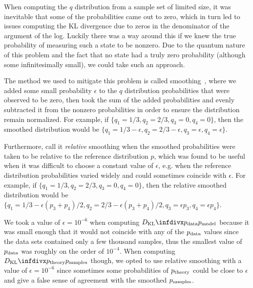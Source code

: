 When computing the \( q \) distribution from a sample set of limited size, it was inevitable that some of the probabilities came out to zero, which in turn led to issues computing the KL divergence due to zeros in the denominator of the argument of the log.
Luckily there was a way around this if we knew the true probability of measuring such a state to be nonzero.
Due to the quantum nature of this problem and the fact that no state had a truly zero probability (although some infinitesimally small), we could take such an approach.

The method we used to mitigate this problem is called smoothing~\cite{han_kl_divergence}, where we added some small probability \( \epsilon \) to the \( q \) distribution probabilities that were observed to be zero, then took the sum of the added probabilities and evenly subtracted it from the nonzero probabilities in order to ensure the distribution remain normalized.
For example, if \( \{q_1 = 1/3, q_2 = 2/3, q_3 = 0, q_4 = 0\} \), then the smoothed distribution would be \( \{q_1 = 1/3 - \epsilon, q_2 = 2/3 - \epsilon, q_3 = \epsilon, q_4 = \epsilon\} \).

Furthermore, call it \textit{relative} smoothing when the smoothed probabilities were taken to be relative to the reference distribution \( p \), which was found to be useful when it was difficult to choose a constant value of \( \epsilon \), e.g. when the reference distribution probabilities varied widely and could sometimes coincide with \( \epsilon \).
For example, if \( \{q_1 = 1/3, q_2 = 2/3, q_3 = 0, q_4 = 0\} \), then the relative smoothed distribution would be \( \{q_1 = 1/3 - \epsilon (p_3 + p_4)/2, q_2 = 2/3 - \epsilon (p_3 + p_4)/2, q_3 = \epsilon p_3, q_4 = \epsilon p_4\} \).

We took a value of \( \epsilon = 10^{-6} \) when computing \( \DKL{\pdata}{\pmodel} \) because it was small enough that it would not coincide with any of the \( p_{\text{data}} \) values since the data sets contained only a few thousand samples, thus the smallest value of \( p_{\text{data}} \) was roughly on the order of \( 10^{-4} \).
When computing \( \DKL{\ptheory}{\psamples} \) though, we opted to use relative smoothing with a value of \( \epsilon = 10^{-6} \) since sometimes some probabilities of \( p_{\text{theory}} \) could be close to \( \epsilon \) and give a false sense of agreement with the smoothed \( p_{\text{samples}} \).

